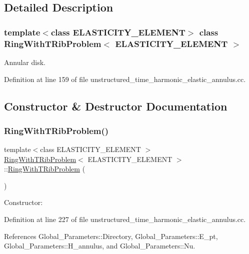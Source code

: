 \subsection{Detailed Description}
\subsubsection*{template$<$class E\+L\+A\+S\+T\+I\+C\+I\+T\+Y\+\_\+\+E\+L\+E\+M\+E\+NT$>$\newline
class Ring\+With\+T\+Rib\+Problem$<$ E\+L\+A\+S\+T\+I\+C\+I\+T\+Y\+\_\+\+E\+L\+E\+M\+E\+N\+T $>$}

Annular disk. 

Definition at line 159 of file unstructured\+\_\+time\+\_\+harmonic\+\_\+elastic\+\_\+annulus.\+cc.



\subsection{Constructor \& Destructor Documentation}
\mbox{\label{classRingWithTRibProblem_ad0313aac3c0cdb87e753ba474a4e334f}} 
\subsubsection{\texorpdfstring{Ring\+With\+T\+Rib\+Problem()}{RingWithTRibProblem()}}
{\footnotesize\ttfamily template$<$class E\+L\+A\+S\+T\+I\+C\+I\+T\+Y\+\_\+\+E\+L\+E\+M\+E\+NT $>$ \\
\hyperlink{classRingWithTRibProblem}{Ring\+With\+T\+Rib\+Problem}$<$ E\+L\+A\+S\+T\+I\+C\+I\+T\+Y\+\_\+\+E\+L\+E\+M\+E\+NT $>$\+::\hyperlink{classRingWithTRibProblem}{Ring\+With\+T\+Rib\+Problem} (\begin{DoxyParamCaption}{ }\end{DoxyParamCaption})}



Constructor\+: 



Definition at line 227 of file unstructured\+\_\+time\+\_\+harmonic\+\_\+elastic\+\_\+annulus.\+cc.



References Global\+\_\+\+Parameters\+::\+Directory, Global\+\_\+\+Parameters\+::\+E\+\_\+pt, Global\+\_\+\+Parameters\+::\+H\+\_\+annulus, and Global\+\_\+\+Parameters\+::\+Nu.



